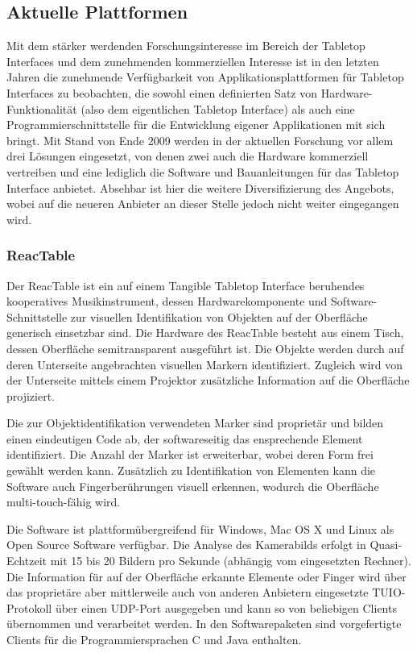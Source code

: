 \subsection{Aktuelle Plattformen} %
\label{sub:aktuelle_plattformen}
Mit dem stärker werdenden Forschungsinteresse im Bereich der Tabletop Interfaces und dem zunehmenden kommerziellen Interesse ist in den letzten Jahren die zunehmende Verfügbarkeit von Applikationsplattformen für Tabletop Interfaces zu beobachten, die sowohl einen definierten Satz von Hardware-Funktionalität (also dem eigentlichen Tabletop Interface) als auch eine Programmierschnittstelle für die Entwicklung eigener Applikationen mit sich bringt. Mit Stand von Ende 2009 werden in der aktuellen Forschung vor allem drei Lösungen eingesetzt, von denen zwei auch die Hardware kommerziell vertreiben und eine lediglich die Software und Bauanleitungen für das Tabletop Interface anbietet. Absehbar ist hier die weitere Diversifizierung des Angebots, wobei auf die neueren Anbieter an dieser Stelle jedoch nicht weiter eingegangen wird.

\subsubsection{ReacTable} %
\label{ssub:reactable}

Der ReacTable \citep{Kaltenbrunner06} ist ein auf einem Tangible Tabletop Interface beruhendes kooperatives Musikinstrument, dessen Hardwarekomponente und Software-Schnittstelle zur visuellen Identifikation von Objekten auf der Oberfläche generisch einsetzbar sind. Die Hardware des ReacTable besteht aus einem Tisch, dessen Oberfläche semitransparent ausgeführt ist. Die Objekte werden durch auf deren Unterseite angebrachten visuellen Markern identifiziert. Zugleich wird von der Unterseite mittels einem Projektor zusätzliche Information auf die Oberfläche projiziert.

Die zur Objektidentifikation verwendeten Marker sind proprietär und bilden einen eindeutigen Code ab, der softwareseitig das ensprechende Element identifiziert. Die Anzahl der Marker ist erweiterbar, wobei deren Form frei gewählt werden kann. Zusätzlich zu Identifikation von Elementen kann die Software auch Fingerberührungen visuell erkennen, wodurch die Oberfläche multi-touch-fähig wird.

Die Software ist plattformübergreifend für Windows, Mac OS X und Linux als Open Source Software verfügbar. Die Analyse des Kamerabilds erfolgt in Quasi-Echtzeit mit 15 bis 20 Bildern pro Sekunde (abhängig vom eingesetzten Rechner). Die Information für auf der Oberfläche erkannte Elemente oder Finger wird über das proprietäre aber mittlerweile auch von anderen Anbietern eingesetzte TUIO-Protokoll über einen \gls{UDP}-Port ausgegeben und kann so von beliebigen Clients übernommen und verarbeitet werden. In den Softwarepaketen sind vorgefertigte Clients für die Programmiersprachen C und Java enthalten.

